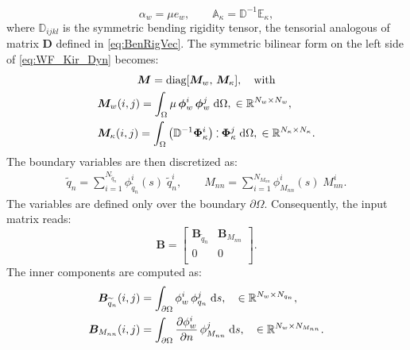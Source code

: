 \documentclass[preprint,12pt]{elsarticle}
\def\onedot{$\mathsurround0pt\ldotp$}
\def\cddot{%
	\mathbin{\vcenter{\baselineskip.67ex
			\hbox{\onedot}\hbox{\onedot}}%
}}
\begin{document}
{\begin{equation}
\alpha_w = \mu e_w, \qquad \mathbb{A}_{\kappa} = \mathbb{D}^{-1} \mathbb{E}_{\kappa},
\end{equation}
where $\mathbb{D}_{ijkl}$ is the symmetric bending rigidity tensor, the tensorial analogous of  matrix $\bm{D}$ defined in \eqref{eq:BenRigVec}. The symmetric bilinear form on the left side of \eqref{eq:WF_Kir_Dyn} becomes: 
\begin{equation}
\begin{gathered}
\bm{M} = \text{diag}[\bm{M}_w,\, \bm{M}_\kappa], \quad \text{with} \\
\begin{aligned}
&\bm{M}_w(i,j) = \int_{\Omega} \mu \, \bm{\phi}_w^i \, \bm{\phi}_w^j \d\Omega, \; \in \mathbb{R}^{N_w \times N_w}, \\
&\bm{M}_\kappa(i,j) = \int_{\Omega}  \left( \mathbb{D}^{-1} \bm{\Phi}_\kappa^i \right) \cddot \bm{\Phi}_\kappa^j \d\Omega, \; \in \mathbb{R}^{N_\kappa \times N_\kappa}.\\
\end{aligned}
\end{gathered}
\end{equation}
The boundary variables are then discretized as:
\begin{equation}
\begin{aligned}
\widetilde{q}_n = \sum_{i = 1}^{N_{\widetilde{q}_n}} \phi_{\widetilde{q}_n}^i(s) \; \widetilde{q}_n^i, \qquad
M_{nn} = \sum_{i = 1}^{N_{M_{nn}}} \phi_{M_{nn}}^i(s) \; M_{nn}^i.
\end{aligned}
\end{equation}
The variables are defined only over the boundary $\partial\Omega$. Consequently, the input matrix reads:
\begin{equation}
\bm{B} = \begin{bmatrix}
\bm{B}_{\widetilde{q}_n} & \bm{B}_{M_{nn}}\\
0 & 0 \\
\end{bmatrix}. 
\end{equation}
The inner components are computed as:
\begin{equation}
\begin{aligned}
\bm{B}_{\widetilde{q}_n}(i,j) &= \int_{\partial\Omega} {\phi}_{w}^i \, {\phi}_{q_n}^j \d{s}, \quad \in \mathbb{R}^{N_w \times N_{q_n}} , \\
\bm{B}_{M_{nn}}(i,j) &= \int_{\partial\Omega} \diffp{\phi_w^i}{n} \, \phi_{M_{nn}}^j \d{s}, \quad \in \mathbb{R}^{N_w \times N_{M_{nn}}} . \\

\end{aligned}
\end{equation}}
\end{document}
